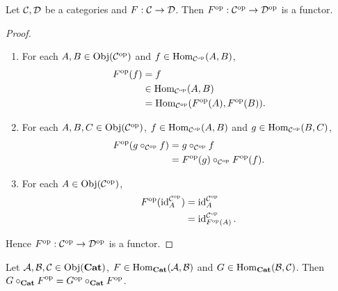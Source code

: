 \documentclass{book}
\begin{document}
	\begin{ex} 
		Let $\MC, \MD$ be a categories and $F:\MC \rightarrow \MD$. Then $\op{F}: \op{\MC} \rightarrow \op{\MD}$ is a functor.
	\end{ex}
	
	\begin{proof}\
		\begin{enumerate}
			\item For each $A,B \in \Obj(\op{\MC})$ and $f \in \Hom_{\op{\MC}}(A,B)$,
			\begin{align*}
				\op{F}(f)
				& = f \\
				& \in \Hom_{\op{\MC}}(A,B) \\
				& = \Hom_{\op{\MC}}(\op{F}(A), \op{F}(B)).
			\end{align*}
			\item For each $A,B,C \in \Obj(\op{\MC})$, $f \in \Hom_{\op{\MC}}(A,B)$ and $g \in \Hom_{\op{\MC}}(B,C)$,
			\begin{align*}
				\op{F}(g \circ_{\op{\MC}} f) 
				& = g \circ_{\op{\MC}} f \\
				& = \op{F}(g) \circ_{\op{\MC}} \op{F}(f). 
			\end{align*}
			\item For each $A \in \Obj(\op{\MC})$, 
			\begin{align*}
				\op{F}(\id_A^{\op{\MC}})
				& = \id_A^{\op{\MC}} \\
				& = \id_{\op{F}(A)}^{\op{\MC}}.
			\end{align*}
		\end{enumerate}
		Hence $\op{F}: \op{\MC} \rightarrow \op{\MD}$ is a functor.
	\end{proof}
	
	\begin{ex} 
		Let $\MA, \MB, \MC \in \Obj(\bCat)$, $F \in \Hom_{\bCat}(\MA, \MB)$ and $G \in \Hom_{\bCat}(\MB, \MC)$. Then $\op{G \circ_{\bCat} F} = \op{G} \circ_{\bCat} \op{F}$.
	\end{ex}
	
\end{document}
